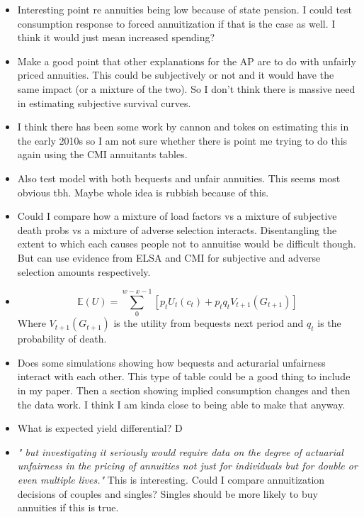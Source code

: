 \documentclass[12pt]{article}
\begin{document}
\begin{itemize}
    \item Interesting point re annuities being low because of state pension.
          I could test consumption response to forced annuitization if that is the
          case as well. I think it would just mean increased spending?

    \item Make a good point that other explanations for the AP are to do with unfairly priced
          annuities. This could be subjectively or not and it would have the same impact (or
          a mixture of the two). So I don't think there is massive need in estimating subjective
          survival curves.

    \item I think there has been some work by cannon and tokes on estimating this in the
          early 2010s so I am not sure whether there is point me trying to do this again using the
          CMI annuitants tables.

    \item Also test model with both bequests and unfair annuities. This seems most obvious tbh.
          Maybe whole idea is rubbish because of this.

    \item Could I compare how a mixture of load factors vs a mixture of subjective death probs
          vs a mixture of adverse selection interacts. Disentangling the extent to which each causes
          people not to annuitise would be difficult though. But can use evidence from ELSA and CMI for
          subjective and adverse selection amounts respectively.

    \item \begin{equation*}
              \mathbb{E}(U) = \sum_{0}^{w - x - 1}[p_{t}U_{t}(c_{t}) + p_{t}q_{t}V_{t+1}(G_{t+1})]
          \end{equation*}
          Where $V_{t+1}(G_{t+1})$ is the utility from bequests next period and $q_{t}$ is the probability of death.


    \item Does some simulations showing how bequests and acturarial unfairness interact with each other.
          This type of table could be a good thing to include in my paper. Then a section showing implied consumption
          changes and then the data work. I think I am kinda close to being able to make that anyway.

    \item What is expected yield differential? D
    \item \textit{" but investigating it seriously would require data on the
              degree of actuarial unfairness in the pricing of annuities not just for
              individuals but for double or even multiple lives."} This is interesting.
          Could I compare annuitization decisions of couples and singles? Singles
          should be more likely to buy annuities if this is true.


\end{itemize}
\end{document}
